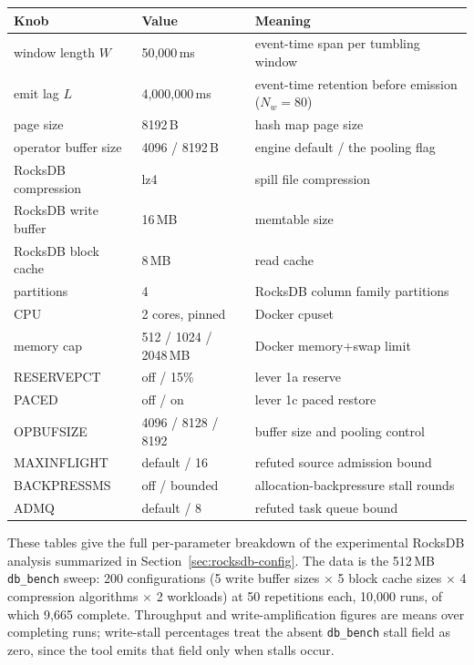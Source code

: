 
\begin{longtable}{|p{4.2cm}|p{2.6cm}|p{6.4cm}|}
\hline
\textbf{Knob} & \textbf{Value} & \textbf{Meaning} \\
\hline
window length $W$ & 50{,}000\,ms & event-time span per tumbling window \\
\hline
emit lag $L$ & 4{,}000{,}000\,ms & event-time retention before emission ($N_w = 80$) \\
\hline
page size & 8192\,B & hash map page size \\
\hline
operator buffer size & 4096 / 8192\,B & engine default / the pooling flag \\
\hline
RocksDB compression & lz4 & spill file compression \\
\hline
RocksDB write buffer & 16\,MB & memtable size \\
\hline
RocksDB block cache & 8\,MB & read cache \\
\hline
partitions & 4 & RocksDB column family partitions \\
\hline
CPU & 2 cores, pinned & Docker cpuset \\
\hline
memory cap & 512 / 1024 / 2048\,MB & Docker memory+swap limit \\
\hline
RESERVEPCT & off / 15\% & lever 1a reserve \\
\hline
PACED & off / on & lever 1c paced restore \\
\hline
OPBUFSIZE & 4096 / 8128 / 8192 & buffer size and pooling control \\
\hline
MAXINFLIGHT & default / 16 & refuted source admission bound \\
\hline
BACKPRESSMS & off / bounded & allocation-backpressure stall rounds \\
\hline
ADMQ & default / 8 & refuted task queue bound \\
\hline
\end{longtable}

\label{app:rocksdb-tables}

These tables give the full per-parameter breakdown of the experimental RocksDB analysis summarized in Section~\ref{sec:rocksdb-config}.
The data is the 512\,MB \texttt{db\_bench} sweep: 200 configurations (5 write buffer sizes $\times$ 5 block cache sizes $\times$ 4 compression algorithms $\times$ 2 workloads) at 50 repetitions each, 10{,}000 runs, of which 9{,}665 complete.
Throughput and write-amplification figures are means over completing runs; write-stall percentages treat the absent \texttt{db\_bench} stall field as zero, since the tool emits that field only when stalls occur.

